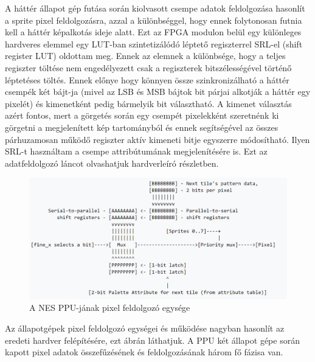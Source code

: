 	A háttér állapot gép futása során kiolvasott csempe adatok feldolgozása hasonlít a sprite pixel feldolgozásra, azzal a különbséggel, hogy ennek folytonosan futnia kell a háttér képalkotás ideje alatt. Ezt az FPGA modulon belül egy különleges hardveres elemmel egy LUT-ban szintetizálódó léptető regiszterrel SRL-el (shift register LUT) oldottam meg. Ennek az elemnek a különbsége, hogy a teljes regiszter töltése nem engedélyezett csak a regiszterek bitszélességével történő léptetéses töltés. Ennek előnye hogy könnyen össze szinkronizálható a háttér csempék két bájt-ja (mivel az LSB és MSB bájtok bit párjai alkotják a háttér egy pixelét) és kimenetként pedig bármelyik bit választható. A kimenet választás azért fontos, mert a görgetés során egy csempét pixelekként szeretnénk ki görgetni a megjelenített kép tartományból és ennek segítségével az összes párhuzamosan működő regiszter aktív kimeneti bitje egyszerre módosítható. Ilyen SRL-t használtam a csempe attribútumának megjelenítésére is. Ezt az adatfeldolgozó láncot olvashatjuk  hardverleíró részletben.
	
	\begin{figure}[H]
	\centering
	\includegraphics[width=120mm, keepaspectratio]{figures/NES-render-chamber}
	\caption{A NES PPU-jának pixel feldolgozó egysége} 
	\label{fig:NES-render-chamber}
	\end{figure} 
	
	Az állapotgépek pixel feldolgozó egységei és működése nagyban hasonlít az eredeti hardver felépítésére, ezt  ábrán láthatjuk. A PPU két állapot gépe során kapott pixel adatok összefűzésének és feldolgozásának három fő fázisa van.
	

